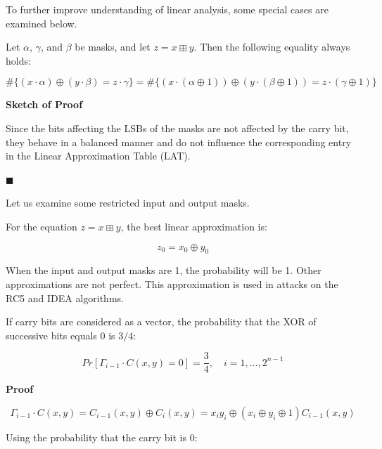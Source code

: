 \documentclass[runningheads]{llncs}
\begin{document}
To further improve understanding of linear analysis, some special cases are examined below.


\begin{lemma}
    
Let $\alpha$, $\gamma$, and $\beta$ be masks, and let $z = x \boxplus y$. Then the following equality always holds:

\[
\#\{(x \cdot \alpha) \oplus (y \cdot \beta) = z \cdot \gamma\} = \#\{(x \cdot (\alpha \oplus 1)) \oplus (y \cdot (\beta \oplus 1)) = z \cdot (\gamma \oplus 1)\}
\]
\end{lemma}
\textbf{Sketch of Proof}

Since the bits affecting the LSBs of the masks are not affected by the carry bit, they behave in a balanced manner and do not influence the corresponding entry in the Linear Approximation Table (LAT).

\hfill $\blacksquare$

\vspace{0.2in}

Let us examine some restricted input and output masks.

\vspace{0.1in}

For the equation $z = x \boxplus y$, the best linear approximation is:

\[
z_0 = x_0 \oplus y_0
\]

When the input and output masks are 1, the probability will be 1. Other approximations are not perfect. This approximation is used in attacks on the RC5 \cite{kaliski1995differential} and IDEA \cite{borst1997differential} algorithms.

\vspace{2em}

\begin{theorem}
    If carry bits are considered as a vector, the probability that the XOR of successive bits equals 0 is $3/4$:

    \[
    Pr[\Gamma_{i-1} \cdot C(x,y) = 0] = \frac{3}{4}, \quad i = 1, \dots, 2^{n-1}
    \]
\end{theorem}

\textbf{Proof}

\[
\Gamma_{i-1} \cdot C(x,y) = C_{i-1}(x,y) \oplus C_{i}(x,y) = x_{i}y_{i} \oplus (x_i \oplus y_i \oplus 1)C_{i-1}(x,y)
\]

\vspace{0.1in}

Using the probability that the carry bit is 0:
\end{document}
